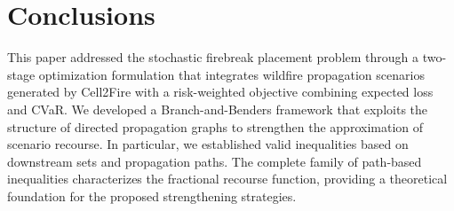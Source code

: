 \documentclass[a4paper,fleqn]{cas-sc}
\begin{document}
% 



\section{Conclusions}\label{sec:conclusions}

This paper addressed the stochastic firebreak placement problem through
a two-stage optimization formulation that integrates wildfire propagation
scenarios generated by Cell2Fire with a risk-weighted objective combining
expected loss and CVaR. We developed a Branch-and-Benders framework
that exploits the structure of directed propagation graphs to strengthen
the approximation of scenario recourse. In particular, we established
valid inequalities based on downstream sets and propagation paths.
The complete family of path-based inequalities characterizes the
fractional recourse function, providing a theoretical foundation for
the proposed strengthening strategies.
\end{document}
